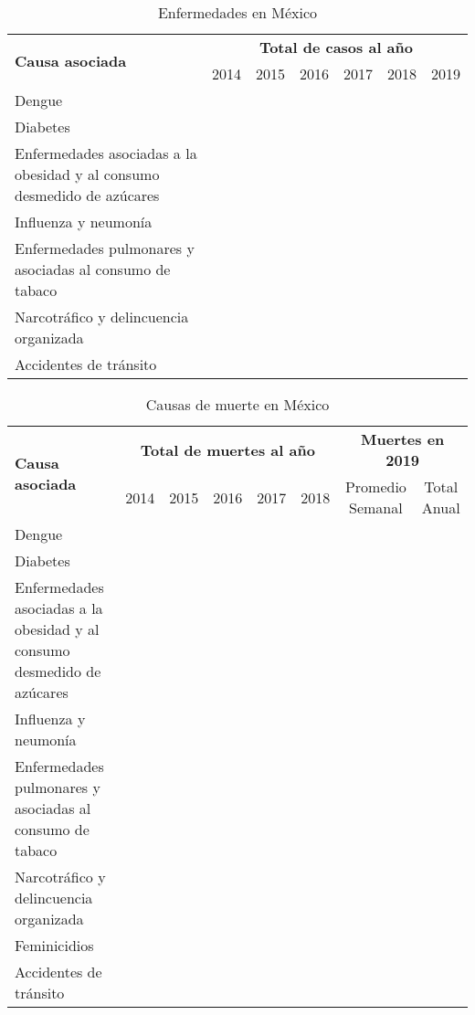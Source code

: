 \documentclass[letterpaper,10.5pt]{article}
\begin{document}
\begin{table}[ht]
	\centering
	\caption{Enfermedades en México}
	\label{tbl:diseases-in-mexico} %
	\begin{tabularx}{0.9\linewidth}{X cccccc }
	\toprule
		\multirow{2}{*}{\bfseries Causa asociada } &
		\multicolumn{6}{c}{\bfseries Total de casos al año }
		\\
		& 2014 & 2015 & 2016 & 2017 & 2018 & 2019
		\\ \midrule
	Dengue                               &~&~&~&~&~&~\\[1cm] \midrule
	Diabetes                             &~&~&~&~&~&~\\[1cm] \midrule
	Enfermedades asociadas a la obesidad
	y al consumo desmedido de azúcares   &~&~&~&~&~&~\\[1cm] \midrule
	Influenza y neumonía                 &~&~&~&~&~&~\\[1cm] \midrule
	Enfermedades pulmonares y asociadas
	al consumo de tabaco                 &~&~&~&~&~&~\\[1cm] \midrule
	Narcotráfico y
	delincuencia organizada              &~&~&~&~&~&~\\[1cm] \midrule
	Accidentes de tránsito               &~&~&~&~&~&~\\[1cm] \bottomrule
	\end{tabularx}
\end{table}

\begin{table}[ht]
	\centering
	\caption{Causas de muerte en México}
	\label{tbl:deaths-in-mexico} %
	\begin{tabularx}{0.9\linewidth}{X ccccc cc }
	\toprule
		\multirow{2}{*}{\bfseries Causa asociada } &
		\multicolumn{5}{c}{\bfseries Total de muertes al año } &
		\multicolumn{2}{c}{\bfseries Muertes en 2019 }
		\\
		& 2014 & 2015 & 2016 & 2017 & 2018 & Promedio Semanal & Total Anual
		\\ \midrule
	Dengue                               &~&~&~&~&~&~\\[1cm] \midrule
	Diabetes                             &~&~&~&~&~&~\\[1cm] \midrule
	Enfermedades asociadas a la obesidad
	y al consumo desmedido de azúcares   &~&~&~&~&~&~\\[1cm] \midrule
	Influenza y neumonía                 &~&~&~&~&~&~\\[1cm] \midrule
	Enfermedades pulmonares y asociadas
	al consumo de tabaco                 &~&~&~&~&~&~\\[1cm] \midrule
	Narcotráfico y
	delincuencia organizada              &~&~&~&~&~&~\\[1cm] \midrule
	Feminicidios                         &~&~&~&~&~&~\\[1cm] \midrule
	Accidentes de tránsito               &~&~&~&~&~&~\\[1cm] \bottomrule
	\end{tabularx}
\end{table}
\end{document}
